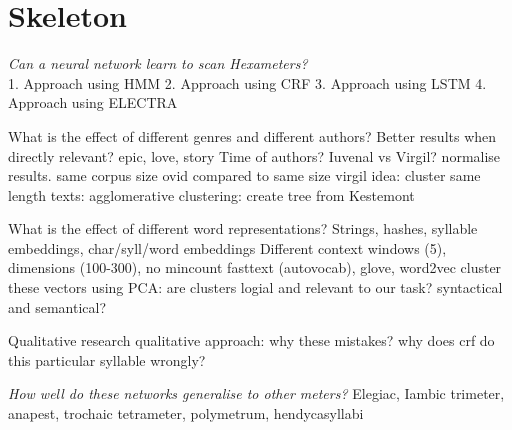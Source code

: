 \section{Skeleton}

\textit{Can a neural network learn to scan Hexameters?}\\

1. Approach using HMM
2. Approach using CRF
3. Approach using LSTM
4. Approach using ELECTRA

What is the effect of different genres and different authors?
  Better results when directly relevant? epic, love, story
  Time of authors? Iuvenal vs Virgil?
    normalise results. same corpus size ovid compared to same size virgil
    idea: cluster same length texts: agglomerative clustering: create tree from Kestemont

What is the effect of different word representations?
  Strings, hashes, syllable embeddings, char/syll/word embeddings
  Different context windows (5), dimensions (100-300), no mincount 
  fasttext (autovocab), glove, word2vec
    cluster these vectors using PCA: are clusters logial and relevant to our task? syntactical and semantical?

Qualitative research
  qualitative approach: why these mistakes? why does crf do this particular syllable wrongly?

\textit{How well do these networks generalise to other meters?}
Elegiac, Iambic trimeter, anapest, trochaic tetrameter, polymetrum, hendycasyllabi







